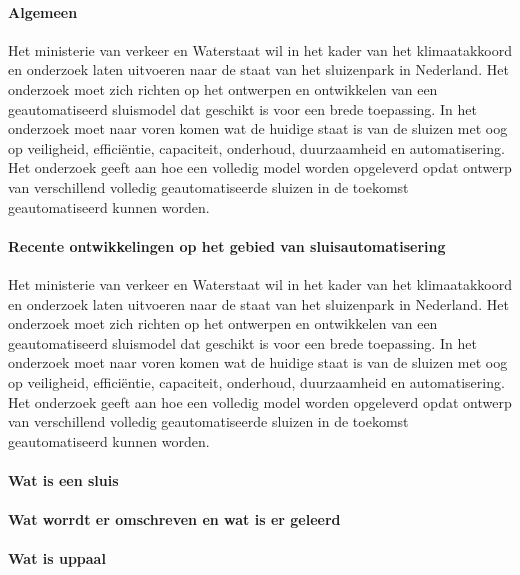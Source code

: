 
 

\paragraph{Algemeen}

Het ministerie van verkeer en Waterstaat wil in het kader van het klimaatakkoord en onderzoek laten uitvoeren naar de staat van het sluizenpark in Nederland. Het onderzoek moet zich richten op het ontwerpen en ontwikkelen van een geautomatiseerd sluismodel dat geschikt is voor een brede toepassing. In het onderzoek moet naar voren komen wat de huidige staat is van de sluizen met oog op veiligheid, efficiëntie, capaciteit, onderhoud, duurzaamheid en automatisering. Het onderzoek geeft aan hoe een volledig model worden opgeleverd opdat ontwerp van verschillend volledig geautomatiseerde sluizen in de toekomst geautomatiseerd kunnen worden.  

\paragraph{Recente ontwikkelingen op het gebied van sluisautomatisering}

Het ministerie van verkeer en Waterstaat wil in het kader van het klimaatakkoord en onderzoek laten uitvoeren naar de staat van het sluizenpark in Nederland. Het onderzoek moet zich richten op het ontwerpen en ontwikkelen van een geautomatiseerd sluismodel dat geschikt is voor een brede toepassing. In het onderzoek moet naar voren komen wat de huidige staat is van de sluizen met oog op veiligheid, efficiëntie, capaciteit, onderhoud, duurzaamheid en automatisering. Het onderzoek geeft aan hoe een volledig model worden opgeleverd opdat ontwerp van verschillend volledig geautomatiseerde sluizen in de toekomst geautomatiseerd kunnen worden.  
\paragraph{Wat is een sluis}

\paragraph{Wat worrdt er omschreven en wat is er geleerd}

\paragraph{Wat is uppaal}

